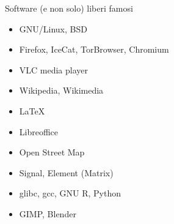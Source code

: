 \begin{myframe}{Software (e non solo) liberi famosi}
  \begin{itemize}[<+->]
    \item GNU/Linux, BSD
    \item Firefox, IceCat, TorBrowser, Chromium
    \item VLC media player
    \item Wikipedia, Wikimedia
    \item \LaTeX
    \item Libreoffice
    \item Open Street Map
    \item Signal, Element (Matrix)
    \item glibc, gcc, GNU R, Python
    \item GIMP, Blender
  \end{itemize}
\end{myframe}

